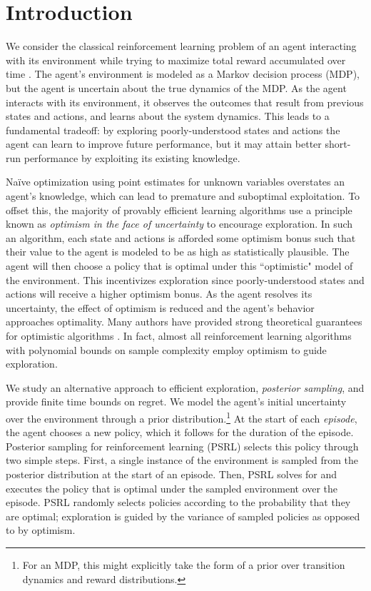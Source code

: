 \section{Introduction}
We consider the classical reinforcement learning problem of an agent interacting with its environment while trying to maximize total reward accumulated over time \cite{burnetas1997optimal, kumar1986stochastic}. The agent's environment is 
modeled as a Markov decision process (MDP), but the agent is uncertain about the true dynamics of the MDP. As the agent interacts with its environment, it observes the outcomes that result from previous states and actions, and learns about the system dynamics. 
This leads to a fundamental tradeoff: by exploring poorly-understood states and actions the agent can learn to improve future performance, but it may attain better short-run performance by exploiting its existing knowledge.

Na\"ive optimization using point estimates for unknown variables overstates an agent's knowledge, which can lead to premature and suboptimal exploitation. To offset this, the majority of provably efficient learning algorithms use a principle known as \emph{optimism in the face of uncertainty} \cite{lai1985asymptotically} to encourage exploration. In such an algorithm, each state and actions is afforded some optimism bonus such that their value to the agent is modeled to be as high as statistically plausible. The agent will then choose a policy that is optimal under this ``optimistic" model of the environment. This incentivizes exploration since poorly-understood states and actions will receive a higher optimism bonus. As the agent resolves its uncertainty, the effect of optimism is reduced and the agent's behavior approaches optimality. Many authors have provided strong theoretical guarantees for optimistic algorithms \cite{jaksch2010near,bartlett2009regal,brafman2003r,kakade2003sample,kearns2002near}. In fact, almost all reinforcement learning algorithms with polynomial bounds on sample complexity employ optimism to guide exploration.

We study an alternative approach to efficient exploration, \emph{posterior sampling}, and provide finite time bounds on regret.  We model the agent's initial uncertainty over the environment through a prior distribution.\footnote{For an MDP, this might explicitly take the form of a prior over transition dynamics and reward distributions.}
At the start of each \emph{episode}, the agent chooses a new policy, which it follows for the duration of the episode. Posterior sampling for reinforcement learning (PSRL) selects this policy through two simple steps. First, a single instance of the environment is sampled from the posterior distribution at the start of an episode. Then, PSRL solves for and executes the policy that is optimal under the sampled environment over the episode. PSRL randomly selects policies according to the probability that they are optimal; exploration is guided by the variance of sampled policies as opposed to by optimism.

